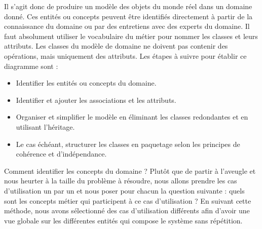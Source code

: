 \begin{itemize}
Il s’agit donc de produire un modèle des objets du monde réel dans un domaine donné. Ces entités ou concepts peuvent être identifiés directement à partir de la connaissance du domaine ou par des entretiens avec des experts du domaine. Il faut absolument utiliser le vocabulaire du métier pour nommer les classes et leurs attributs. Les classes du modèle de domaine ne doivent pas contenir des opérations, mais uniquement des attributs\cite{7}. Les étapes à suivre pour établir ce diagramme sont :
\begin{itemize}
    \item [\textbullet] Identifier les entités ou concepts du domaine.
    \item [\textbullet] Identifier et ajouter les associations et les attributs.
    \item [\textbullet] Organiser et simplifier le modèle en éliminant les classes redondantes et en utilisant l'héritage.
    \item [\textbullet] Le cas échéant, structurer les classes en paquetage selon les principes de cohérence et d'indépendance.
\end{itemize}
Comment identifier les concepts du domaine ? Plutôt que de partir à l’aveugle et nous heurter à la taille du problème à résoudre, nous allons prendre les cas d’utilisation un par un et nous poser pour chacun la question suivante : quels sont les concepts métier qui participent à ce cas d’utilisation ? En suivant cette méthode, nous avons sélectionné des cas d’utilisation différents afin d’avoir une vue globale sur les différentes entités qui compose le système sans répétition.


\end{itemize}
